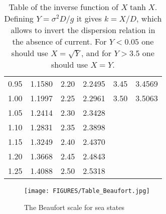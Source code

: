 \documentclass[a4paper]{book}  %
\begin{document}
\begin{table}
\begin{tabular}{cccccc}
       0.95    &     1.1580   &     2.20 & 2.2495 &     3.45  &      3.4569   \\
       1.00    &     1.1997   &     2.25 & 2.2961 &     3.50  &      3.5063   \\
       1.05    &     1.2414   &     2.30 & 2.3428 &   &     \\
       1.10    &     1.2831   &     2.35 & 2.3898 &   &     \\
       1.15    &     1.3249   &     2.40 & 2.4370 &   &     \\
       1.20    &     1.3668   &     2.45 & 2.4843 &   &     \\
       1.25    &     1.4088   &     2.50 & 2.5318 &   &     \\
    \hline                  
\hline
\end{tabular}
  \caption{Table of the inverse function of $X \tanh X$. Defining $Y=\sigma^2 D/g$ it gives $k=X/D$, 
which allows to invert the dispersion relation in the absence of current. 
For $Y< 0.05$ one should use $X=\sqrt{Y}$, and for $Y >3.5$ one should use $X=Y$.}\label{table_tracks}
\end{table}

\begin{figure}
\centerline{\texttt{[image: FIGURES/Table\_Beaufort.jpg]}}
\caption{The Beaufort scale for sea states \label{table_beaufort}}
\end{figure}


\end{document}
